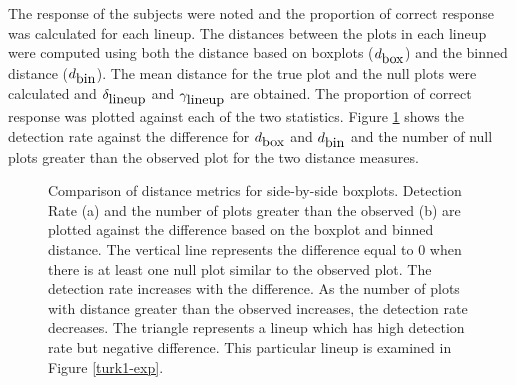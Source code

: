 \documentclass[12]{article}
\begin{document}
The response of the subjects were noted and the proportion of correct response was calculated for each lineup. The distances between the plots in each lineup were computed using both the distance based on boxplots ($d_{\hbox{box}}$) and the binned distance ($d_{\hbox{bin}}$). The mean distance for the true plot and the null plots were calculated and $\delta_{\hbox{lineup}}$ and $\gamma_{\hbox{lineup}}$ are obtained. The proportion of correct response was plotted against each of the two statistics. Figure \ref{turk1comp} shows the detection rate against the difference for $d_{\hbox{box}}$ and $d_{\hbox{bin}}$ and the number of null plots greater than the observed plot for the two distance measures. 


\begin{figure}[hbtp]
\centering
{}
	\vspace{-.1in}
\caption[Optional caption for list of figures]{Comparison of distance metrics for side-by-side boxplots. Detection Rate (a) and the number of plots greater than the observed (b) are plotted against the difference based on the boxplot and binned distance. The vertical line represents the difference equal to 0 when there is at least one null plot similar to the observed plot. The detection rate increases with the difference. As the number of plots with distance greater than the observed increases, the detection rate decreases.  The triangle represents a lineup which has high detection rate but negative difference. This particular lineup is examined in Figure \ref{turk1-exp}. }
\label{turk1comp}
\end{figure}
\end{document}
